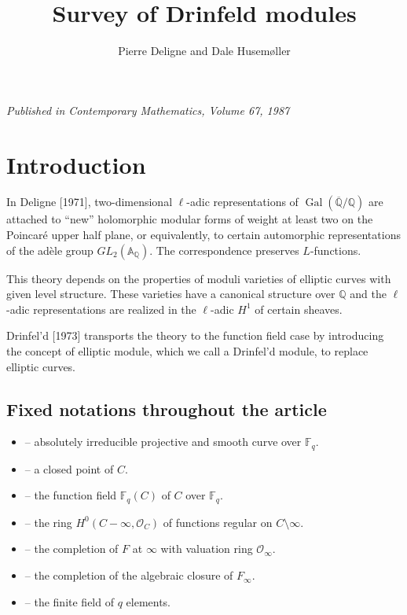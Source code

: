 \documentclass[12pt,a4paper]{article}
\title{Survey of Drinfeld modules}
\author{Pierre Deligne and Dale Husem\o ller}
\date{}
\theoremstyle{plain}
\theoremstyle{definition}
\theoremstyle{remark}
\DeclareMathOperator{\Gal}{Gal}
\newcommand{\bF}{\mathbb{F}}
\newcommand{\bQ}{\mathbb{Q}}
\newcommand{\bA}{\mathbb{A}}
\newcommand{\cO}{\mathcal{O}}
\providecommand{\cO}{\mathcal{O}}
\providecommand{\Gal}{\operatorname{Gal}}
\begin{document}

\maketitle

\begin{center}
\textit{Published in Contemporary Mathematics, Volume 67, 1987}
\end{center}

\vspace{1cm}

\tableofcontents

\newpage

\section*{Introduction}

In Deligne [1971], two-dimensional $\ell$-adic representations of $\Gal(\overline{\bQ}/\bQ)$ are attached to ``new'' holomorphic modular forms of weight at least two on the Poincar\'e upper half plane, or equivalently, to certain automorphic representations of the ad\`ele group $GL_2(\bA_\bQ)$. The correspondence preserves $L$-functions.

This theory depends on the properties of moduli varieties of elliptic curves with given level structure. These varieties have a canonical structure over $\bQ$ and the $\ell$-adic representations are realized in the $\ell$-adic $H^1$ of certain sheaves.

Drinfel'd [1973] transports the theory to the function field case by introducing the concept of elliptic module, which we call a Drinfel'd module, to replace elliptic curves.

\subsection*{Fixed notations throughout the article}

\begin{itemize}[leftmargin=2cm]
\item[$C$] -- absolutely irreducible projective and smooth curve over $\bF_q$.
\item[$\infty$] -- a closed point of $C$.
\item[$F$] -- the function field $\bF_q(C)$ of $C$ over $\bF_q$.
\item[$A$] -- the ring $H^0(C - \infty, \cO_C)$ of functions regular on $C \setminus \infty$.
\item[$F_\infty$] -- the completion of $F$ at $\infty$ with valuation ring $\cO_\infty$.
\item[$C_\infty$] -- the completion of the algebraic closure of $F_\infty$.
\item[$\bF_q$] -- the finite field of $q$ elements.
\end{itemize}
\end{document}
